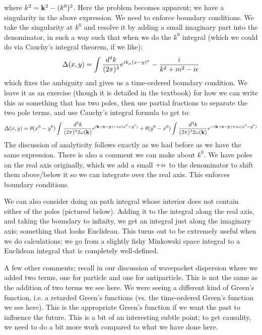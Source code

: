 where $k^2 = \mathbf{k}^2 - (k^0)^2$. Here the problem becomes apparent; we have a singularity in the above expression. We need to enforce boundary conditions. We take the singularity at $k^0$ and resolve it by adding a small imaginary part into the denominator, in such a way such that when we do the $k^0$ integral (which we could do via Cauchy's integral theorem, if we like):
\begin{equation}
    \Delta(x, y) = \int \frac{d^4k}{(2\pi)^4}e^{ik_\mu(x - y)^\mu} - \frac{i}{k^2 + m^2 - i\epsilon} 
\end{equation}
which fixes the ambiguity and gives us a time-ordered boundary condition. We leave it as an exercise (though it is detailed in the textbook) for how we can write this as something that has two poles, then use partial fractions to separate the two pole terms, and use Cauchy's integral formula to get to:
\begin{equation}
    \Delta(x, y) = \theta(x^0 - y^0) \int \frac{d^3k}{(2\pi)^3 2\omega(\mathbf{k})}e^{i\mathbf{k} \cdot (\mathbf{x} - \mathbf{y}) - i\omega(x^0 - y^0)} + \theta(y^0 - x^0)\int \frac{d^3k}{(2\pi)^3 2\omega(\mathbf{k})}e^{-i\mathbf{k} \cdot (\mathbf{x} - \mathbf{y}) + i\omega(x^0 - y^0)}
\end{equation}
The discussion of analyticity follows exactly as we had before as we have the same expression. There is also a comment we can make about $k^0$. We have poles on the real axis originally, which we add a small $+i\epsilon$ to the denominator to shift them above/below it so we can integrate over the real axis. This enforces boundary conditions. 

We can also consider doing an path integral whose interior does not contain either of the poles (pictured below). Adding it to the integral along the real axis, and taking the boundary to infinity, we get an integral just along the imaginary axis; something that looks Euclidean. This turns out to be extremely useful when we do calculations; we go from a slightly fishy Minkowski space integral to a Euclidean integral that is completely well-defined.

A few other comments; recall in our discussion of wavepacket dispersion where we added two terms, one for particle and one for antiparticle. This is not the same as the addition of two terms we see here. We were seeing a different kind of Green's function, i.e. a retarded Green's functions (vs. the time-ordered Green's function we see here). This is the appropriate Green's function if we want the past to influence the future. This is a bit of an interesting subtle point; to get causality, we need to do a bit more work compared to what we have done here.

